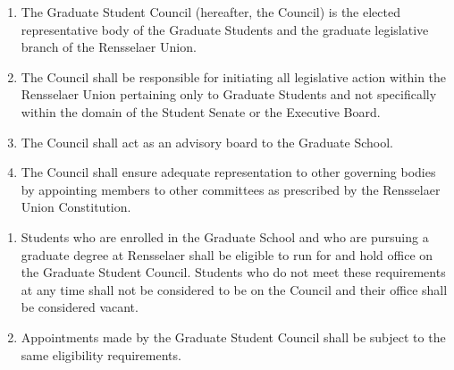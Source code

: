 



\begin{enumerate}
\item The Graduate Student Council (hereafter, the Council) is the elected representative body of the Graduate Students and the graduate legislative branch of the Rensselaer Union.
\item The Council shall be responsible for initiating all legislative action within the Rensselaer Union pertaining only to Graduate Students and not specifically within the domain of the Student Senate or the Executive Board.
\item The Council shall act as an advisory board to the Graduate School.
\item The Council shall ensure adequate representation to other governing bodies by appointing members to other committees as prescribed by the Rensselaer Union Constitution.
\end{enumerate}


\begin{enumerate}
\item Students who are enrolled in the Graduate School and who are pursuing a graduate degree at Rensselaer shall be eligible to run for and hold office on the Graduate Student Council. Students who do not meet these requirements at any time shall not be considered to be on the Council and their office shall be considered vacant.
\item Appointments made by the Graduate Student Council shall be subject to the same eligibility requirements.
\end{enumerate}



